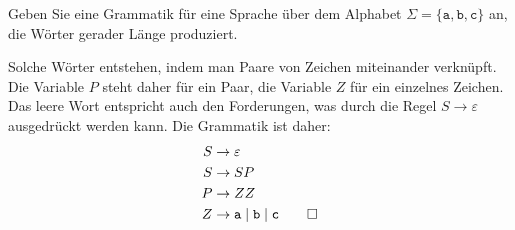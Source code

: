 Geben Sie eine Grammatik für eine Sprache über dem Alphabet
$\Sigma=\{\texttt{a},\texttt{b},\texttt{c}\}$ an, die Wörter gerader
Länge produziert.


\begin{loesung}
Solche Wörter entstehen, indem man Paare von Zeichen miteinander
verknüpft.
Die Variable $P$ steht daher für ein Paar, die Variable $Z$ für ein
einzelnes Zeichen.
Das leere Wort entspricht auch den Forderungen, was durch die Regel
$S\to\varepsilon$ ausgedrückt werden kann.
Die Grammatik ist daher:
\begin{align*}
S&\to \varepsilon \\
S&\to SP \\
P&\to ZZ \\
Z&\to \texttt{a} \mid \texttt{b} \mid \texttt{c}
\qedhere
\end{align*}
\end{loesung}
